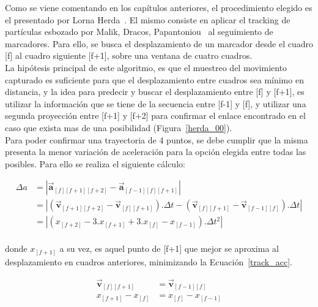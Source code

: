 Como se viene comentando en los capítulos anteriores, el procedimiento elegido es el presentado por Lorna Herda~\cite{herda}. El mismo consiste en aplicar el tracking de partículas esbozado por Malik, Dracos, Papantoniou~\cite{griegos} al seguimiento de marcadores. Para ello, se busca el desplazamiento de un marcador desde el cuadro [f] al cuadro siguiente [f+1], sobre una ventana de cuatro cuadros.
\\ 

La hipótesis principal de este algoritmo, es que el muestreo del movimiento capturado es suficiente para que el desplazamiento entre cuadros sea mínimo en distancia, y la idea para predecir y buscar el desplazamiento entre [f] y [f+1], es utilizar la información que se tiene de la secuencia entre [f-1] y [f], y utilizar una segunda proyección entre [f+1] y [f+2] para confirmar el enlace encontrado en el caso que exista mas de una posibilidad (Figura~\ref{herda_00}).
\\ 

Para poder confirmar una trayectoria de 4 puntos, se debe cumplir que la misma presenta la menor variación de aceleración para la opción elegida entre todas las posibles. Para ello se realiza el siguiente cálculo:

\begin{equation}
\begin{split}
\Delta{a}&= \left| \boldsymbol{\overrightarrow{a}}_{[f][f+1][f+2]}-\boldsymbol{\overrightarrow{a}}_{[f-1][f][f+1]} \right| \\
&= \left| \left(\boldsymbol{\overrightarrow{v}}_{[f+1][f+2]}-\boldsymbol{\overrightarrow{v}}_{[f][f+1]}\right).\Delta{t}-\left(\boldsymbol{\overrightarrow{v}}_{[f][f+1]}-\boldsymbol{\overrightarrow{v}}_{[f-1][f]}\right).\Delta{t} \right| \\
&= \left|\left( x_{[f+2]} - 3.x_{[f+1]} + 3.x_{[f]} - x_{[f-1]} \right).\Delta{t}^2\right|\\
\end{split}
\label{track_var_acc}
\end{equation}

donde $x_{[f+1]}$ a su vez, es aquel punto de [f+1] que mejor se aproxima al desplazamiento en cuadros anteriores, minimizando la Ecuación~\ref{track_acc}. 

\begin{equation}
\begin{split}
\boldsymbol{\overrightarrow{v}}_{[f][f+1]}& = \boldsymbol{\overrightarrow{v}}_{[f-1][f]} \\
x_{[f+1]}-x_{[f]}& = x_{[f]}-x_{[f-1]} \\
\end{split}
\label{track_acc}
\end{equation}

